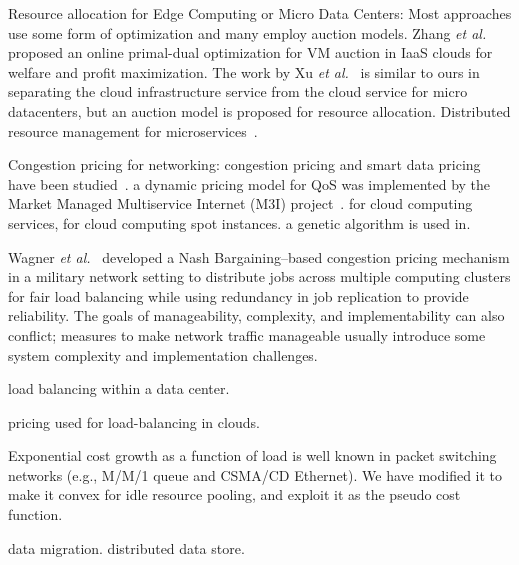 
Resource allocation for Edge Computing or Micro Data Centers:
Most approaches use some form of optimization and many employ auction
models.
Zhang {\em et al.}~\cite{Xu2017-zenith,Zhang2017-VMauction}
proposed an online primal-dual optimization for VM auction in IaaS
clouds for welfare and profit maximization.
The work by Xu {\em et al.}~\cite{Xu2017-zenith} is similar to ours in
separating the cloud infrastructure service from the cloud service for
micro datacenters, but an auction model is proposed for resource
allocation.
Distributed resource management for microservices~\cite{Suresh-SOA-SOCC2017}.

Congestion pricing for networking:
congestion pricing and smart data pricing have been
studied~\cite{pricing-internet-1994,Kelly-1998,gibbens1999resource,Henderson2001,Sen-2013}.
a dynamic pricing model for QoS was implemented by the
Market Managed Multiservice Internet (M3I) project~\cite{Briscoe2003-M3I}.
for cloud computing services\cite{Wang-hotcloud2010,Kilcioglu-SIGMETRICS2015},
for cloud computing spot instances\cite{Song-INFOCOM2017}.
a genetic algorithm is used in\cite{Macias-SAC2011}.

Wagner {\em et al.}~\cite{Wagner-2012} developed a Nash
Bargaining–based congestion pricing mechanism in a military network
setting to distribute jobs across multiple computing clusters for fair
load balancing while using redundancy in job replication to provide
reliability. The goals of manageability, complexity, and
implementability can also conflict; measures to make network traffic
manageable usually introduce some system complexity and implementation
challenges.

load balancing within a data center\cite{Rikhtegar2021BiTEAD}.

pricing used for load-balancing in clouds\cite{Song-2014,Ren-2017}.

Exponential cost growth as a function of load is well known in packet
switching networks (e.g., M/M/1 queue and CSMA/CD Ethernet).
We have modified it to make it convex for idle resource pooling, and
exploit it as the pseudo cost function.

data migration\cite{Pu2015-geodistdata}.
distributed data store\cite{Shima2012,Tahoe-2008}.


